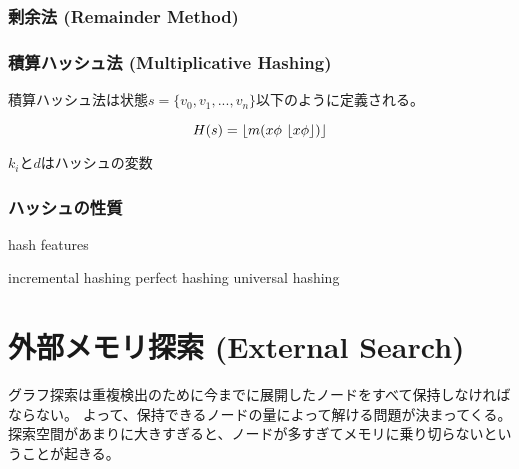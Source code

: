 \subsubsection{剰余法 (Remainder Method)}

\subsubsection{積算ハッシュ法 (Multiplicative Hashing)}
積算ハッシュ法は状態$s = \{v_0, v_1,...,v_n\}$以下のように定義される。

\begin{equation}
	H(s) = \lfloor m (x \phi \ \lfloor x \phi\rfloor)\rfloor
\end{equation}

$k_i$と$d$はハッシュの変数

\subsubsection{ハッシュの性質}

{\TODO hash features}

incremental hashing
perfect hashing
universal hashing








\section{外部メモリ探索 (External Search)}
\label{sec:external-search}


グラフ探索は重複検出のために今までに展開したノードをすべて保持しなければならない。
よって、保持できるノードの量によって解ける問題が決まってくる。
探索空間があまりに大きすぎると、ノードが多すぎてメモリに乗り切らないということが起きる。

